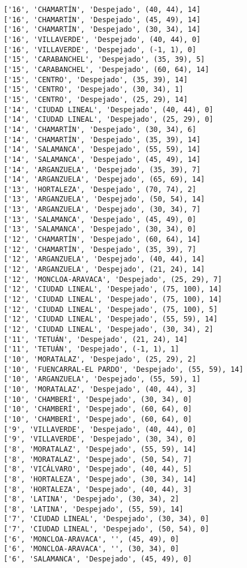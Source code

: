 \documentclass[11pt]{article}
\begin{document}
\begin{Verbatim}[commandchars=\\\{\}]
['16', 'CHAMARTÍN', 'Despejado', (40, 44), 14]
['16', 'CHAMARTÍN', 'Despejado', (45, 49), 14]
['16', 'CHAMARTÍN', 'Despejado', (30, 34), 14]
['16', 'VILLAVERDE', 'Despejado', (40, 44), 0]
['16', 'VILLAVERDE', 'Despejado', (-1, 1), 0]
['15', 'CARABANCHEL', 'Despejado', (35, 39), 5]
['15', 'CARABANCHEL', 'Despejado', (60, 64), 14]
['15', 'CENTRO', 'Despejado', (35, 39), 14]
['15', 'CENTRO', 'Despejado', (30, 34), 1]
['15', 'CENTRO', 'Despejado', (25, 29), 14]
['14', 'CIUDAD LINEAL', 'Despejado', (40, 44), 0]
['14', 'CIUDAD LINEAL', 'Despejado', (25, 29), 0]
['14', 'CHAMARTÍN', 'Despejado', (30, 34), 6]
['14', 'CHAMARTÍN', 'Despejado', (35, 39), 14]
['14', 'SALAMANCA', 'Despejado', (55, 59), 14]
['14', 'SALAMANCA', 'Despejado', (45, 49), 14]
['14', 'ARGANZUELA', 'Despejado', (35, 39), 7]
['14', 'ARGANZUELA', 'Despejado', (65, 69), 14]
['13', 'HORTALEZA', 'Despejado', (70, 74), 2]
['13', 'ARGANZUELA', 'Despejado', (50, 54), 14]
['13', 'ARGANZUELA', 'Despejado', (30, 34), 7]
['13', 'SALAMANCA', 'Despejado', (45, 49), 0]
['13', 'SALAMANCA', 'Despejado', (30, 34), 0]
['12', 'CHAMARTÍN', 'Despejado', (60, 64), 14]
['12', 'CHAMARTÍN', 'Despejado', (35, 39), 7]
['12', 'ARGANZUELA', 'Despejado', (40, 44), 14]
['12', 'ARGANZUELA', 'Despejado', (21, 24), 14]
['12', 'MONCLOA-ARAVACA', 'Despejado', (25, 29), 7]
['12', 'CIUDAD LINEAL', 'Despejado', (75, 100), 14]
['12', 'CIUDAD LINEAL', 'Despejado', (75, 100), 14]
['12', 'CIUDAD LINEAL', 'Despejado', (75, 100), 5]
['12', 'CIUDAD LINEAL', 'Despejado', (55, 59), 14]
['12', 'CIUDAD LINEAL', 'Despejado', (30, 34), 2]
['11', 'TETUÁN', 'Despejado', (21, 24), 14]
['11', 'TETUÁN', 'Despejado', (-1, 1), 1]
['10', 'MORATALAZ', 'Despejado', (25, 29), 2]
['10', 'FUENCARRAL-EL PARDO', 'Despejado', (55, 59), 14]
['10', 'ARGANZUELA', 'Despejado', (55, 59), 1]
['10', 'MORATALAZ', 'Despejado', (40, 44), 3]
['10', 'CHAMBERÍ', 'Despejado', (30, 34), 0]
['10', 'CHAMBERÍ', 'Despejado', (60, 64), 0]
['10', 'CHAMBERÍ', 'Despejado', (60, 64), 0]
['9', 'VILLAVERDE', 'Despejado', (40, 44), 0]
['9', 'VILLAVERDE', 'Despejado', (30, 34), 0]
['8', 'MORATALAZ', 'Despejado', (55, 59), 14]
['8', 'MORATALAZ', 'Despejado', (50, 54), 7]
['8', 'VICÁLVARO', 'Despejado', (40, 44), 5]
['8', 'HORTALEZA', 'Despejado', (30, 34), 14]
['8', 'HORTALEZA', 'Despejado', (40, 44), 3]
['8', 'LATINA', 'Despejado', (30, 34), 2]
['8', 'LATINA', 'Despejado', (55, 59), 14]
['7', 'CIUDAD LINEAL', 'Despejado', (30, 34), 0]
['7', 'CIUDAD LINEAL', 'Despejado', (50, 54), 0]
['6', 'MONCLOA-ARAVACA', '', (45, 49), 0]
['6', 'MONCLOA-ARAVACA', '', (30, 34), 0]
['6', 'SALAMANCA', 'Despejado', (45, 49), 0]

\end{Verbatim}
\end{document}
